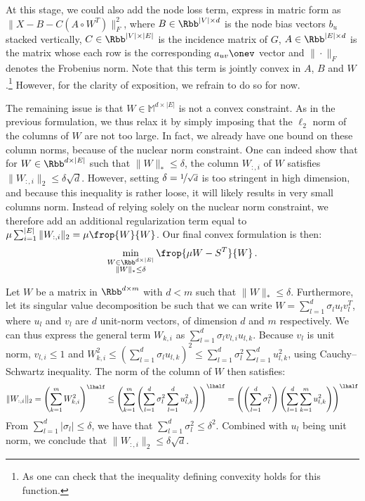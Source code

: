 At this stage, we could also add the node loss term, express in matric form as $\|X - B -
C\left(A\circ W^T \right)\|_F^2$, where $B\in \Rbb^{|V| \times d}$ is the node bias vectors $b_u$
stacked vertically, $C \in \Rbb^{|V| \times |E|}$ is the incidence matrix of $G$, $A \in \Rbb^{|E|
\times d}$ is the matrix whose each row is the corresponding $a_{uv}\onev$ vector and $\|\cdot\|_F$
denotes the Frobenius norm. Note that this term is jointly convex in $A$, $B$ and $W$.\footnote{As
one can check that the inequality defining convexity holds for this function.} However, for the
clarity of exposition, we refrain to do so for now.

The remaining issue is that $W\in \mathbb{M}^{d\times |E|}$ is not a convex constraint. As in the
previous formulation, we thus relax it by simply imposing that the $\ell_2$ norm of the columns of
$W$ are not too large. In fact, we already have one bound on these column norms, because of the
nuclear norm constraint. One can indeed show that for $W\in \Rbb^{d\times |E|}$ such that $\|W\|_*
\leq \delta$, the \ith{} column $W_{:,i}$ of $W$ satisfies $\|W_{:,i}\|_2 \leq \delta\sqrt{d}$.
However, setting $\delta = \nicefrac{1}{\sqrt{d}}$ is too stringent in high dimension, and because
this inequality is rather loose, it will likely results in very small columns norm. Instead of
relying solely on the nuclear norm constraint, we therefore add an additional regularization term
equal to $\mu \sum_{i=1}^{|E|} \|W_{:,i}\|_2 = \mu \frop{W}{W}$. Our final convex formulation is
then:
\begin{equation}
  \label{eq:edge_FW}
  \min_{\substack{W\in \Rbb^{d\times |E|} \\ \|W\|_* \leq \delta}} \frop{\mu W - S^T}{W} \,.
\end{equation}

\begin{aside}
  Let $W$ be a matrix in $\Rbb^{d\times m}$ with $d < m$ such that $\|W\|_* \leq \delta$.
  Furthermore, let its singular value decomposition be such that we can write $W = \sum_{l=1}^d
  \sigma_l u_l v_l^T$, where $u_l$ and $v_l$ are $d$ unit-norm vectors, of dimension $d$ and $m$
  respectively. We can thus express the general term $W_{k,i}$ as $\sum_{l=1}^d \sigma_l v_{l,i}
  u_{l,k}$. Because $v_l$ is unit norm, $v_{l,i} \leq 1$ and $W_{k,i}^2 \leq \left( \sum_{l=1}^d
  \sigma_l u_{l,k} \right)^2 \leq \sum_{l=1}^d \sigma_l^2 \sum_{l=1}^d u_{l,k}^2$, using
  Cauchy--Schwartz inequality. The norm of the \ith{} column of $W$ then satisfies:
  \begin{equation*}
    \|W_{:,i}\|_2 = \left( \sum_{k=1}^m W_{k,i}^2 \right)^\lhalf
    \leq \left( \sum_{k=1}^m \left( \sum_{l=1}^d \sigma_l^2 \sum_{l=1}^d u_{l,k}^2 \right) \right)^\lhalf
    = \left( \left( \sum_{l=1}^d \sigma_l^2 \right) \left( \sum_{l=1}^d \sum_{k=1}^m u_{l,k}^2 \right) \right)^\lhalf
  \end{equation*}
  From $\sum_{l=1}^d |\sigma_l | \leq \delta$, we have that $\sum_{l=1}^d \sigma_l^2 \leq \delta^2$.
  Combined with $u_l$ being unit norm, we conclude that $\|W_{:,i}\|_2 \leq \delta\sqrt{d}$.
\end{aside}

